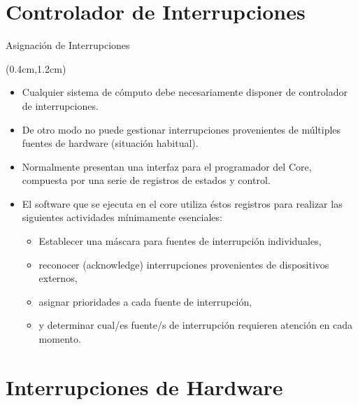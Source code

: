 \documentclass[usenames,table,xcolor={x11names},aspectratio=169]{beamer}
\begin{document}
\section{Controlador de Interrupciones}
\begin{frame}[t]{Asignación de Interrupciones}
 \begin{textblock*}{\textwidth}(0.4cm,1.2cm)
  \begin{itemize}[<+(1)->]\justifying 
   \item Cualquier sistema de cómputo debe necesariamente disponer de controlador de interrupciones.
   \item De otro modo no puede gestionar interrupciones provenientes de múltiples fuentes de hardware (situación habitual). 
   \item Normalmente presentan una interfaz para el programador del Core, compuesta por una serie de registros de estados y control.
   \item El software que se ejecuta en el core utiliza éstos registros para realizar las siguientes actividades mínimamente esenciales:
   \begin{itemize}[<+(1)->]\justifying \parskip 0.18cm
    \item Establecer una máscara para fuentes de interrupción individuales, 
    \item reconocer (acknowledge) interrupciones provenientes de dispositivos externos, 
    \item asignar prioridades a cada fuente de interrupción, 
    \item y determinar cual/es fuente/s de interrupción requieren atención en cada momento.
   \end{itemize}
  \end{itemize}
 \end{textblock*}
\end{frame}

\section{Interrupciones de Hardware}
\end{document}
